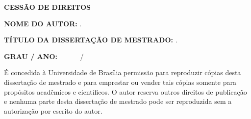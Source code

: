 \begin{fichacatalografica}
		\vspace{6mm}
		
		\noindent  \MakeUppercase{\textbf{Cess\~{a}o de Direitos}} 
		
		\vspace{5mm}
		
		\noindent \textbf{NOME DO AUTOR:} \imprimirautor.
		\vspace{6mm}
		
		\noindent \textbf{T\'{I}TULO DA DISSERTA\c{C}\~{A}O DE MESTRADO:}
		\imprimirtitulo.
		
		\vspace{3mm}
		\noindent \textbf{GRAU / ANO:}~ ~ ~ \MakeUppercase\imprimirgrau~ / \imprimirano
		
		\vspace{5mm}
		
		\noindent \'{E} concedida \`{a} Universidade de Bras\'{i}lia permiss\~{a}o para reproduzir c\'{o}pias desta disserta\c{c}\~{a}o de mestrado e para emprestar ou vender tais c\'{o}pias somente para prop\'{o}sitos acad\^{e}micos e cient\'{i}ficos. O autor reserva outros direitos de publica\c{c}\~{a}o e nenhuma parte desta disserta\c{c}\~{a}o de mestrado pode ser reproduzida sem a autoriza\c{c}\~{a}o por escrito do autor.
		
		\vspace{10mm}
		
		\noindent \underline{\hspace{65mm}}
		
		\vspace{-2mm}
		
		\noindent  \imprimirautor
		\vspace{-2mm}
		
		\noindent 
		\vspace{-2mm}
		
		\vspace{-2mm}
\end{fichacatalografica}

\newpage